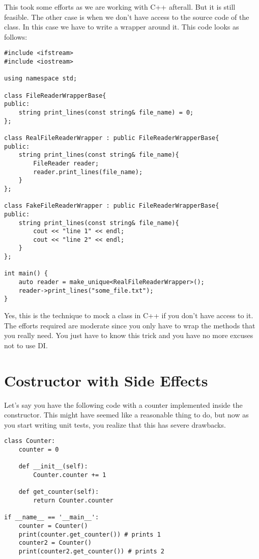 This took some efforts as we are working with C++ afterall. But it is still feasible. The other case is when we don't have access to the source code of the  class. In this case we have to write a wrapper around it. This code looks as follows:

\begin{programcode}{}
\begin{verbatim}
#include <ifstream>
#include <iostream>

using namespace std;

class FileReaderWrapperBase{
public:
    string print_lines(const string& file_name) = 0;
};

class RealFileReaderWrapper : public FileReaderWrapperBase{
public:
    string print_lines(const string& file_name){
        FileReader reader;
        reader.print_lines(file_name);
    }
};

class FakeFileReaderWrapper : public FileReaderWrapperBase{
public:
    string print_lines(const string& file_name){
        cout << "line 1" << endl;
        cout << "line 2" << endl;
    }
};

int main() {
    auto reader = make_unique<RealFileReaderWrapper>();
    reader->print_lines("some_file.txt");
}
\end{verbatim}
\end{programcode}

Yes, this is the technique to mock a class in C++ if you don't have access to it. The efforts required are moderate since you only have to wrap the methods that you really need. You just have to know this trick and you have no more excuses not to use DI.

\section{Costructor with Side Effects}

Let's say you have the following code with a counter implemented inside the constructor. This might have seemed like a reasonable thing to do, but now as you start writing unit tests, you realize that this has severe drawbacks.

\begin{programcode}{}
\begin{verbatim}
class Counter:
    counter = 0

    def __init__(self):
        Counter.counter += 1

    def get_counter(self):
        return Counter.counter

if __name__ == '__main__':
    counter = Counter()
    print(counter.get_counter()) # prints 1
    counter2 = Counter()
    print(counter2.get_counter()) # prints 2
\end{verbatim}
\end{programcode}

